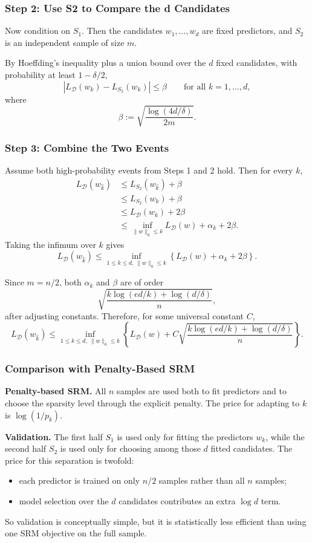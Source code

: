 \documentclass{article}
\newcommand{\cD}{\mathcal{D}}
\begin{document}
\subsubsection{Step 2: Use S2 to Compare the d Candidates}

Now condition on $S_1$. Then the candidates $w_1,\dots,w_d$ are fixed predictors, and $S_2$ is an independent sample of size $m$.

By Hoeffding's inequality plus a union bound over the $d$ fixed candidates, with probability at least $1-\delta/2$,
$$
\left|L_{\cD}(w_k)-L_{S_2}(w_k)\right|
\le
\beta
\qquad
\text{for all } k=1,\dots,d,
$$
where
$$
\beta
:=
\sqrt{
\frac{
\log(4d/\delta)
}{
2m
}
}.
$$

\subsubsection{Step 3: Combine the Two Events}

Assume both high-probability events from Steps 1 and 2 hold. Then for every $k$,
\begin{align*}
L_{\cD}(w_{\widehat{k}})
&\le
L_{S_2}(w_{\widehat{k}})+\beta \\
&\le
L_{S_2}(w_k)+\beta \\
&\le
L_{\cD}(w_k)+2\beta \\
&\le
\inf_{\|w\|_0\le k} L_{\cD}(w)+\alpha_k+2\beta.
\end{align*}
Taking the infimum over $k$ gives
$$
L_{\cD}(w_{\widehat{k}})
\le
\inf_{1\le k\le d,\ \|w\|_0\le k}
\left\{
L_{\cD}(w)+\alpha_k+2\beta
\right\}.
$$

Since $m=n/2$, both $\alpha_k$ and $\beta$ are of order
$$
\sqrt{
\frac{
k\log(ed/k)+\log(d/\delta)
}{n}
},
$$
after adjusting constants. Therefore, for some universal constant $C$,
$$
L_{\cD}(w_{\widehat{k}})
\le
\inf_{1\le k\le d,\ \|w\|_0\le k}
\left\{
L_{\cD}(w)
+
C
\sqrt{
\frac{
k\log(ed/k)+\log(d/\delta)
}{n}
}
\right\}.
$$

\subsubsection{Comparison with Penalty-Based SRM}

\textbf{Penalty-based SRM.}
All $n$ samples are used both to fit predictors and to choose the sparsity level through the explicit penalty. The price for adapting to $k$ is $\log(1/p_k)$.

\textbf{Validation.}
The first half $S_1$ is used only for fitting the predictors $w_k$, while the second half $S_2$ is used only for choosing among those $d$ fitted candidates. The price for this separation is twofold:
\begin{itemize}
\item each predictor is trained on only $n/2$ samples rather than all $n$ samples;
\item model selection over the $d$ candidates contributes an extra $\log d$ term.
\end{itemize}
So validation is conceptually simple, but it is statistically less efficient than using one SRM objective on the full sample.
\end{document}
